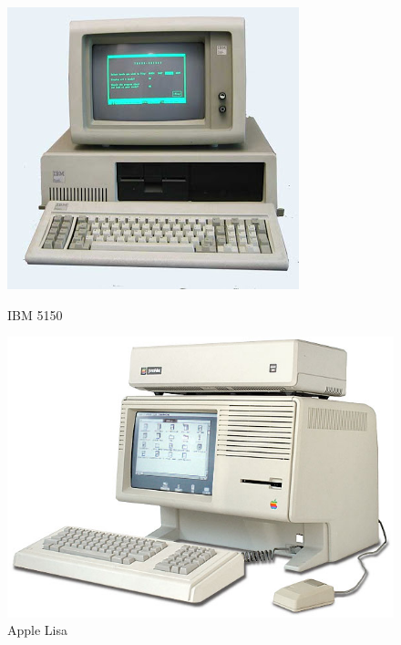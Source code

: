 \documentclass{report}
\begin{document}
\begin{figure}[h]

	\centering 
	\begin{minipage}[b]{.48\textwidth}
	
		\includegraphics[width = 1\linewidth]{fig6.png}		
		\caption{IBM 5150}
		\label{5150}
		
	\end{minipage}	
	\begin{minipage}[b]{.48\textwidth}
	
		\includegraphics[width = 1\linewidth]{fig7.png}
		\caption{Apple Lisa}
		\label{lisa}
		
	\end{minipage}	
			
\end{figure}
\end{document}
